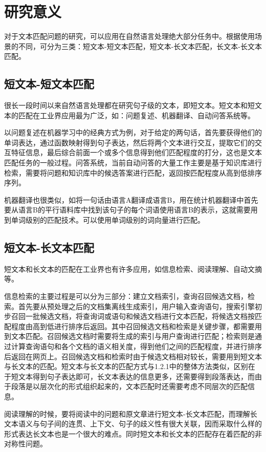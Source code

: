 \section{研究意义}
对于文本匹配问题的研究，可以应用在自然语言处理绝大部分任务中。根据使用场景的不同，可分为三类：短文本-短文本匹配，短文本-长文本匹配，长文本-长文本匹配。

\subsection{短文本-短文本匹配}
很长一段时间以来自然语言处理都在研究句子级的文本，即短文本。短文本和短文本的匹配在工业界应用最为广泛，如：问题复述、机器翻译、自动问答系统等。

以问题复述在机器学习中的经典方式为例，对于给定的两句话，首先要获得他们的单词表达，通过函数映射得到句子表达，然后将两个文本进行交互，提取它们的交互特征信息，最后综合前面一个或多个信息得到他们匹配程度的打分，这也是文本匹配任务的一般过程。问答系统，当前自动问答的大量工作主要是基于知识库进行检索，需要将问题和知识库中的候选答案进行匹配，返回按匹配程度从高到低排序序列。

机器翻译也很类似，如将一句话由语言A翻译成语言B，用在统计机器翻译中首先要从语言B的平行语料库中找到该句子的每个词语使用语言B的表示，这就需要用到单词级别的匹配技术。可以使用单词级别的词向量进行匹配。

\subsection{短文本-长文本匹配}
短文本和长文本的匹配在工业界也有许多应用，如信息检索、阅读理解、自动文摘等。

信息检索的主要过程是可以分为三部分：建立文档索引，查询召回候选文档，检索。首先要从预处理之后的文档集离线生成索引，用户输入查询语句，搜索引擎初步召回一批候选文档，将查询词或语句和候选文档进行文本匹配，将候选文档按匹配程度由高到低进行排序后返回。其中召回候选文档和检索是关键步骤，都需要用到文本匹配。召回候选文档时需要将生成的索引与用户查询进行匹配；检索则是通过计算查询语句和各个文档的语义相关度，得到他们之间的匹配程度，并进行排序后返回在网页上。召回候选文档和检索时由于候选文档相对较长，需要用到短文本与长文本的匹配。短文本与长文本的匹配方式与1.2.1中的整体方法类似，区别在于短文本得到句子表达即可，长文本表达的信息更多，还需要得到段落表达，而由于段落是以层次化的形式组织起来的，文本匹配时还需要考虑不同层次的匹配信息。

阅读理解的时候，要将阅读中的问题和原文章进行短文本-长文本匹配，而理解长文本语义与句子间的连贯、上下文、句子的歧义性有很大关联，因而采取什么样的形式表达长文本也是一个很大的难点。同时短文本和长文本的匹配存在着匹配的非对称性问题。

